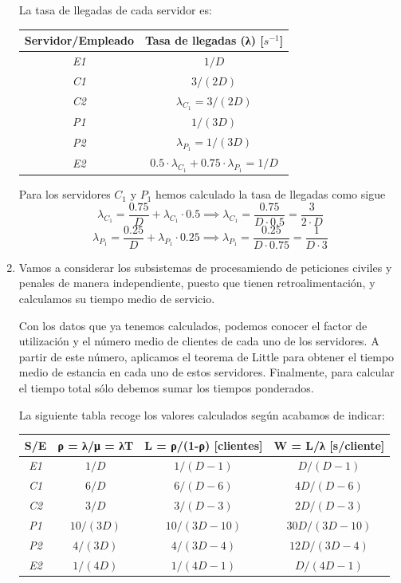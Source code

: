 \begin{problem}[21]
\begin{enumerate}
La tasa de llegadas de cada servidor es:

\begin{center}
\begin{tabular}{| c |  c |}
\hline
  \textbf{Servidor/Empleado}  & \textbf{Tasa de llegadas (λ) [$s^{-1}$]}\\
\hline
 \textit{E1}& $1/D$\\
 \textit{C1}& $3/(2D)$\\
 \textit{C2}& $λ_{C_1} = 3/(2D)$\\
 \textit{P1}& $1/(3D)$\\
 \textit{P2}& $λ_{P_1} = 1/(3D)$\\
 \textit{E2}& $0.5 \cdot λ_{C_1}+0.75 \cdot λ_{P_1} = 1/D$\\
\hline
\end{tabular}
\end{center}

Para los servidores $C_1$ y $P_1$ hemos calculado la tasa de llegadas como sigue
\[λ_{C_1}=\frac{0.75}{D}+λ_{C_1}\cdot 0.5 \implies λ_{C_1} = \frac{0.75}{D \cdot 0.5} = \frac{3}{2\cdot D}\]
\[λ_{P_1}=\frac{0.25}{D}+λ_{P_1}\cdot 0.25 \implies λ_{P_1} = \frac{0.25}{D \cdot 0.75} = \frac{1}{D \cdot 3}\]

\item

Vamos a considerar los subsistemas de procesamiendo de peticiones civiles y penales de manera independiente, puesto que tienen retroalimentación, y calculamos su tiempo medio de servicio.

Con los datos que ya tenemos calculados, podemos conocer el factor de utilización y el número medio de clientes de cada uno de los servidores. A partir de este número, aplicamos el teorema de Little para obtener el tiempo medio de estancia en cada uno de estos servidores. Finalmente, para calcular el tiempo total sólo debemos sumar los tiempos ponderados.

La siguiente tabla recoge los valores calculados según acabamos de indicar:

\begin{adjustwidth}{-2cm}{-2cm}
\begin{center}
\begin{tabular}{| c | c | c | c |}
\hline
  \textbf{S/E}  & \textbf{ρ = λ/μ = λT} & \textbf{L  = ρ/(1-ρ) [clientes]} & \textbf{W  = L/λ  [s/cliente]}\\
\hline
 \textit{E1}& $1/D$ & $1/(D-1)$ & $D/(D-1)$ \\
 \textit{C1}& $6/D$ & $6/(D-6)$ & $4D/(D-6)$ \\
 \textit{C2}& $3/D$ & $3/(D-3)$ & $2D/(D-3)$ \\
 \textit{P1}& $10/(3D)$ & $10/(3D-10)$ & $30D/(3D-10)$ \\
 \textit{P2}& $4/(3D)$ & $4/(3D-4)$ & $12D/(3D-4)$ \\
 \textit{E2}& $1/(4D)$ & $1/(4D-1)$ & $D/(4D-1)$ \\
\hline
\end{tabular}
\end{center}
\end{adjustwidth}


\end{enumerate}
\end{problem}

